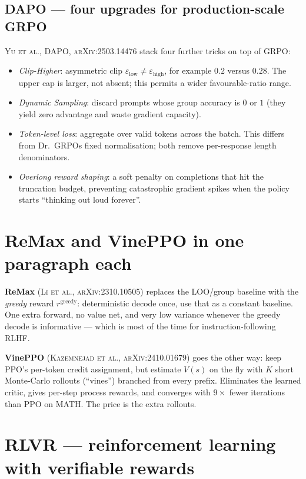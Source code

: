 \documentclass[11pt,oneside]{scrbook}
\begin{document}
\subsection*{DAPO --- four upgrades for production-scale GRPO}

\textsc{Yu et al., DAPO, arXiv:2503.14476} stack four further tricks on top
of GRPO:

\begin{itemize}\setlength{\itemsep}{2pt}
  \item \emph{Clip-Higher}: asymmetric clip $\varepsilon_\text{low} \ne \varepsilon_\text{high}$,
        for example $0.2$ versus $0.28$. The upper cap is larger, not absent; this permits a wider favourable-ratio range.
  \item \emph{Dynamic Sampling}: discard prompts whose group accuracy is $0$
        or $1$ (they yield zero advantage and waste gradient capacity).
  \item \emph{Token-level loss}: aggregate over valid tokens across the batch. This differs from Dr.~GRPO\textquotesingle s fixed normalisation; both remove per-response length denominators.
  \item \emph{Overlong reward shaping}: a soft penalty on completions that
        hit the truncation budget, preventing catastrophic gradient spikes
        when the policy starts ``thinking out loud forever''.
\end{itemize}

\section{ReMax and VinePPO in one paragraph each}

\textbf{ReMax} (\textsc{Li et al., arXiv:2310.10505}) replaces the LOO/group
baseline with the \emph{greedy} reward $r^\text{greedy}$: deterministic
decode once, use that as a constant baseline. One extra forward, no value
net, and very low variance whenever the greedy decode is informative ---
which is most of the time for instruction-following RLHF.

\textbf{VinePPO} (\textsc{Kazemnejad et al., arXiv:2410.01679}) goes the
other way: keep PPO's per-token credit assignment, but estimate $V(s)$ on
the fly with $K$ short Monte-Carlo rollouts (``vines'') branched from
every prefix. Eliminates the learned critic, gives per-step process
rewards, and converges with $9\times$ fewer iterations than PPO on MATH.
The price is the extra rollouts.

\section{RLVR --- reinforcement learning with verifiable rewards}
\end{document}
